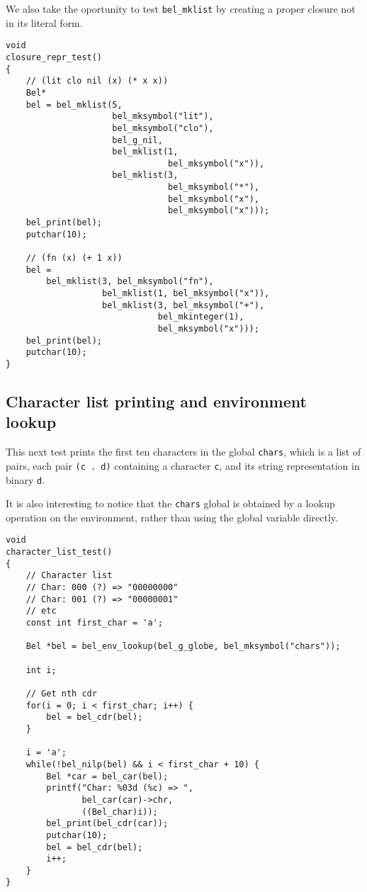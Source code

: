 \documentclass[openright,a4paper,twoside,12pt]{memoir}
\begin{document}
We also take the oportunity to test \texttt{bel\_mklist} by creating a proper
closure not in its literal form.

\begin{verbatim}
void
closure_repr_test()
{
    // (lit clo nil (x) (* x x))
    Bel*
    bel = bel_mklist(5,
                     bel_mksymbol("lit"),
                     bel_mksymbol("clo"),
                     bel_g_nil,
                     bel_mklist(1,
                                bel_mksymbol("x")),
                     bel_mklist(3,
                                bel_mksymbol("*"),
                                bel_mksymbol("x"),
                                bel_mksymbol("x")));
    bel_print(bel);
    putchar(10);

    // (fn (x) (+ 1 x))
    bel =
        bel_mklist(3, bel_mksymbol("fn"),
                   bel_mklist(1, bel_mksymbol("x")),
                   bel_mklist(3, bel_mksymbol("+"),
                              bel_mkinteger(1),
                              bel_mksymbol("x")));
    bel_print(bel);
    putchar(10);     
}
\end{verbatim}

\subsection{Character list printing and environment lookup}
\label{sec:org9a364ab}

This next test prints the first ten characters in the global \texttt{chars},
which is a list of pairs, each pair \texttt{(c . d)} containing a character \texttt{c},
and its string representation in binary \texttt{d}.

It is also interesting to notice that the \texttt{chars} global is obtained by
a lookup operation on the environment, rather than using the global
variable directly.

\begin{verbatim}
void
character_list_test()
{
    // Character list
    // Char: 000 (?) => "00000000"
    // Char: 001 (?) => "00000001"
    // etc
    const int first_char = 'a';
    
    Bel *bel = bel_env_lookup(bel_g_globe, bel_mksymbol("chars"));
    
    int i;

    // Get nth cdr
    for(i = 0; i < first_char; i++) {
        bel = bel_cdr(bel);
    }

    i = 'a';
    while(!bel_nilp(bel) && i < first_char + 10) {
        Bel *car = bel_car(bel);
        printf("Char: %03d (%c) => ",
               bel_car(car)->chr,
               ((Bel_char)i));
        bel_print(bel_cdr(car));
        putchar(10);
        bel = bel_cdr(bel);
        i++;
    }
}
\end{verbatim}
\end{document}
